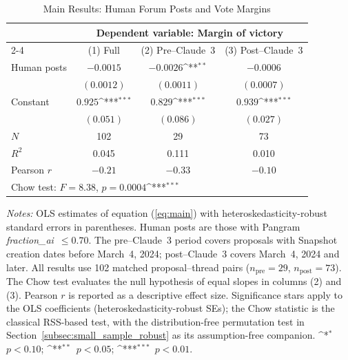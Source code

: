 \documentclass[12pt]{article}
\newcommand{\sym}[1]{\ifmmode^{#1}\else\(^{#1}\)\fi}
\begin{document}
\begin{table}[H]
\centering
\caption{Main Results: Human Forum Posts and Vote Margins}
\label{tab:main_results}
\begin{singlespace}
\begin{tabular}{lccc}
\toprule
 & \multicolumn{3}{c}{Dependent variable: Margin of victory} \\
\cmidrule(lr){2-4}
 & \multicolumn{1}{c}{(1) Full} & \multicolumn{1}{c}{(2) Pre--Claude~3} & \multicolumn{1}{c}{(3) Post--Claude~3} \\
\midrule
Human posts         & $-0.0015$      & $-0.0026$\sym{**}   & $-0.0006$     \\
                    & $(0.0012)$     & $(0.0011)$          & $(0.0007)$    \\
Constant            & $0.925$\sym{***} & $0.829$\sym{***}  & $0.939$\sym{***} \\
                    & $(0.051)$      & $(0.086)$           & $(0.027)$     \\
\midrule
$N$                 & 102            & 29                  & 73            \\
$R^2$               & 0.045          & 0.111               & 0.010         \\
Pearson $r$         & $-0.21$        & $-0.33$             & $-0.10$       \\
\midrule
\multicolumn{4}{l}{Chow test: $F = 8.38$, $p = 0.0004$\sym{***}} \\
\bottomrule
\end{tabular}
\begin{flushleft}
\small\textit{Notes:} OLS estimates of equation (\ref{eq:main}) with heteroskedasticity-robust
standard errors in parentheses. Human posts are those with Pangram \textit{fraction\_ai}~$\leq 0.70$.
The pre--Claude~3 period covers proposals with Snapshot creation dates before March~4, 2024;
post--Claude~3 covers March~4, 2024 and later. All results use 102 matched proposal--thread
pairs ($n_{\text{pre}} = 29$, $n_{\text{post}} = 73$).
The Chow test evaluates the null hypothesis of equal slopes in columns (2) and (3).
Pearson $r$ is reported as a descriptive effect size. Significance stars apply to the
OLS coefficients (heteroskedasticity-robust SEs); the Chow statistic is the classical
RSS-based test, with the distribution-free permutation test in
Section~\ref{subsec:small_sample_robust} as its assumption-free companion.
\sym{*}~$p < 0.10$; \sym{**}~$p < 0.05$; \sym{***}~$p < 0.01$.
\end{flushleft}
\end{singlespace}
\end{table}
\end{document}
